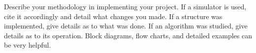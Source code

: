 Describe your methodology in implementing your project. If a simulator is used,
cite it accordingly and detail what changes you made. If a structure was implemented, give details
as to what was done. If an algorithm was studied, give details as to its
operation. Block diagrams,
flow charts, and detailed examples can be very helpful. 